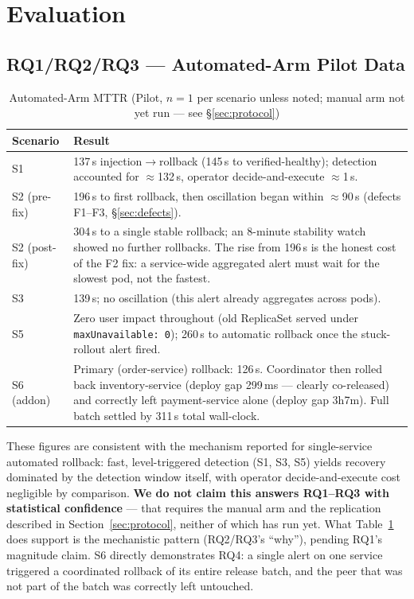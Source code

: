 \documentclass[conference]{IEEEtran}
\begin{document}
\section{Evaluation}

\subsection{RQ1/RQ2/RQ3 --- Automated-Arm Pilot Data}
\begin{table}[h]
\centering
\footnotesize
\caption{Automated-Arm MTTR (Pilot, $n=1$ per scenario unless noted; manual arm not yet run --- see \S\ref{sec:protocol})}
\label{tab:results}
\begin{tabular}{@{}p{1.5cm}p{6.3cm}@{}}
\toprule
\textbf{Scenario} & \textbf{Result} \\
\midrule
S1 & 137\,s injection$\rightarrow$rollback (145\,s to verified-healthy); detection accounted for $\approx$132\,s, operator decide-and-execute $\approx$1\,s. \\
S2 (pre-fix) & 196\,s to first rollback, then oscillation began within $\approx$90\,s (defects F1--F3, \S\ref{sec:defects}). \\
S2 (post-fix) & 304\,s to a single stable rollback; an 8-minute stability watch showed no further rollbacks. The rise from 196\,s is the honest cost of the F2 fix: a service-wide aggregated alert must wait for the slowest pod, not the fastest. \\
S3 & 139\,s; no oscillation (this alert already aggregates across pods). \\
S5 & Zero user impact throughout (old ReplicaSet served under \texttt{maxUnavailable: 0}); 260\,s to automatic rollback once the stuck-rollout alert fired. \\
S6 (addon) & Primary (order-service) rollback: 126\,s. Coordinator then rolled back inventory-service (deploy gap 299\,ms --- clearly co-released) and correctly left payment-service alone (deploy gap 3h7m). Full batch settled by 311\,s total wall-clock. \\
\bottomrule
\end{tabular}
\end{table}
These figures are consistent with the mechanism reported for single-service automated rollback: fast, level-triggered detection (S1, S3, S5) yields recovery dominated by the detection window itself, with operator decide-and-execute cost negligible by comparison. \textbf{We do not claim this answers RQ1--RQ3 with statistical confidence} --- that requires the manual arm and the replication described in Section~\ref{sec:protocol}, neither of which has run yet. What Table~\ref{tab:results} does support is the mechanistic pattern (RQ2/RQ3's ``why''), pending RQ1's magnitude claim. S6 directly demonstrates RQ4: a single alert on one service triggered a coordinated rollback of its entire release batch, and the peer that was not part of the batch was correctly left untouched.
\end{document}
